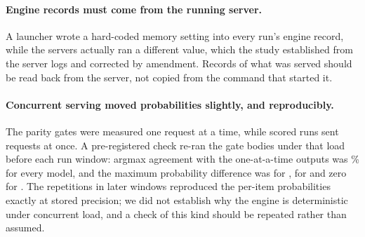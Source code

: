 \paragraph{Engine records must come from the running server.} A launcher wrote a hard-coded memory setting into
every run's engine record, while the servers actually ran a different value, which the study established from the
server logs and corrected by amendment. Records of what was served should be read back from the server, not copied
from the command that started it.

\paragraph{Concurrent serving moved probabilities slightly, and reproducibly.} The parity gates were measured one
request at a time, while scored runs sent \dtConcInFlight{} requests at once. A pre-registered check re-ran the gate
bodies under that load before each run window: argmax agreement with the one-at-a-time outputs was
\dtConcClefAgree\% for every model, and the maximum probability difference was \dtConcClefMaxDp{} for \clef{},
\dtConcFlashMaxDp{} for \flash{} and zero for \pplx{}. The repetitions in later windows reproduced the per-item
probabilities exactly at stored precision; we did not establish why the engine is deterministic under concurrent
load, and a check of this kind should be repeated rather than assumed.
